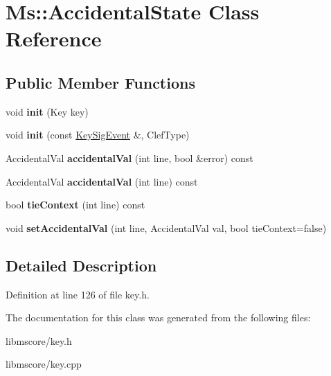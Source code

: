 \hypertarget{class_ms_1_1_accidental_state}{}\section{Ms\+:\+:Accidental\+State Class Reference}
\label{class_ms_1_1_accidental_state}
\subsection*{Public Member Functions}
\begin{DoxyCompactItemize}
\item 
\mbox{\label{class_ms_1_1_accidental_state_a3d8092df8cff6239b00865e957610f9e}} 
void {\bfseries init} (Key key)
\item 
\mbox{\label{class_ms_1_1_accidental_state_a4d711a857b9c5e812150adeb7d8135ec}} 
void {\bfseries init} (const \hyperlink{class_ms_1_1_key_sig_event}{Key\+Sig\+Event} \&, Clef\+Type)
\item 
\mbox{\label{class_ms_1_1_accidental_state_afa144bf490065fc512d539d10b4f97a9}} 
Accidental\+Val {\bfseries accidental\+Val} (int line, bool \&error) const
\item 
\mbox{\label{class_ms_1_1_accidental_state_abf81f096bd848df02a3281e1681c0730}} 
Accidental\+Val {\bfseries accidental\+Val} (int line) const
\item 
\mbox{\label{class_ms_1_1_accidental_state_a9d9baaf5ee46f3a4ad37bb7d51fbc9f2}} 
bool {\bfseries tie\+Context} (int line) const
\item 
\mbox{\label{class_ms_1_1_accidental_state_a4cf6bef47042f2a3c675375c913306ed}} 
void {\bfseries set\+Accidental\+Val} (int line, Accidental\+Val val, bool tie\+Context=false)
\end{DoxyCompactItemize}


\subsection{Detailed Description}


Definition at line 126 of file key.\+h.



The documentation for this class was generated from the following files\+:\begin{DoxyCompactItemize}
\item 
libmscore/key.\+h\item 
libmscore/key.\+cpp\end{DoxyCompactItemize}
